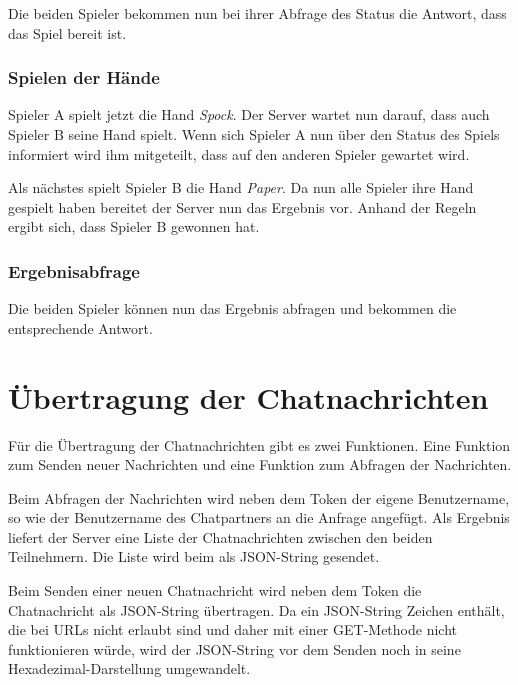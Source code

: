 Die beiden Spieler bekommen nun bei ihrer Abfrage des Status die Antwort, dass das Spiel bereit ist.

\subsubsection{Spielen der Hände}
Spieler A spielt jetzt die Hand \textit{Spock}. Der Server wartet nun darauf, dass auch Spieler B seine Hand spielt. Wenn sich Spieler A nun über den Status des Spiels informiert wird ihm mitgeteilt, dass auf den anderen Spieler gewartet wird.

Als nächstes spielt Spieler B die Hand \textit{Paper}. Da nun alle Spieler ihre Hand gespielt haben bereitet der Server nun das Ergebnis vor. Anhand der Regeln ergibt sich, dass Spieler B gewonnen hat.

\subsubsection{Ergebnisabfrage}
Die beiden Spieler können nun das Ergebnis abfragen und bekommen die entsprechende Antwort.

\section{Übertragung der Chatnachrichten}
Für die Übertragung der Chatnachrichten gibt es zwei Funktionen. Eine Funktion zum Senden neuer Nachrichten und eine Funktion zum Abfragen der Nachrichten.

Beim Abfragen der Nachrichten wird neben dem Token der eigene Benutzername, so wie der Benutzername des Chatpartners an die Anfrage angefügt. Als Ergebnis liefert der Server eine Liste der Chatnachrichten zwischen den beiden Teilnehmern. Die Liste wird beim  als JSON-String gesendet.

Beim Senden einer neuen Chatnachricht wird neben dem Token die Chatnachricht als JSON-String übertragen. Da ein JSON-String Zeichen enthält, die bei URLs nicht erlaubt sind und daher mit einer GET-Methode nicht funktionieren würde, wird der JSON-String vor dem Senden noch in seine Hexadezimal-Darstellung umgewandelt.